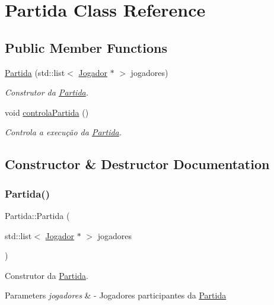 \hypertarget{class_partida}{}\section{Partida Class Reference}
\label{class_partida}
\subsection*{Public Member Functions}
\begin{DoxyCompactItemize}
\item 
\mbox{\hyperlink{class_partida_a34df2e467d28b2d1008974d2a37487df}{Partida}} (std\+::list$<$ \mbox{\hyperlink{class_jogador}{Jogador}} $\ast$ $>$ jogadores)
\begin{DoxyCompactList}\small\item\em Construtor da \mbox{\hyperlink{class_partida}{Partida}}. \end{DoxyCompactList}\item 
void \mbox{\hyperlink{class_partida_ac33f17557cd766c7daccdc26dcaba906}{controla\+Partida}} ()
\begin{DoxyCompactList}\small\item\em Controla a execução da \mbox{\hyperlink{class_partida}{Partida}}. \end{DoxyCompactList}\end{DoxyCompactItemize}


\subsection{Constructor \& Destructor Documentation}
\mbox{\label{class_partida_a34df2e467d28b2d1008974d2a37487df}} 
\subsubsection{\texorpdfstring{Partida()}{Partida()}}
{\footnotesize\ttfamily Partida\+::\+Partida (\begin{DoxyParamCaption}\item[{std\+::list$<$ \mbox{\hyperlink{class_jogador}{Jogador}} $\ast$ $>$}]{jogadores }\end{DoxyParamCaption})}



Construtor da \mbox{\hyperlink{class_partida}{Partida}}. 


\begin{DoxyParams}{Parameters}
{\em jogadores} & -\/ Jogadores participantes da \mbox{\hyperlink{class_partida}{Partida}} \\
\hline
\end{DoxyParams}


